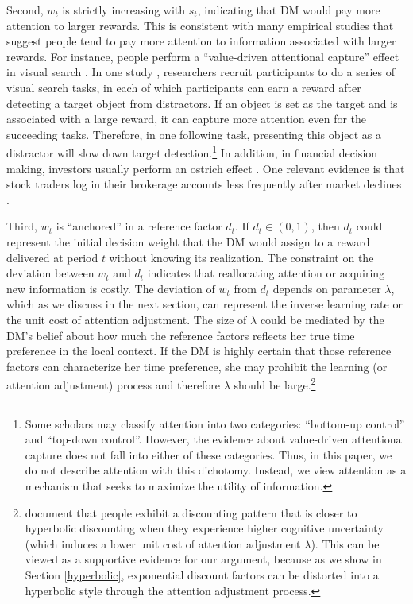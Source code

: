 \documentclass[
  12pt,
]{article}
\begin{document}
Second, \(w_t\) is strictly increasing with \(s_t\), indicating that DM
would pay more attention to larger rewards. This is consistent with many
empirical studies that suggest people tend to pay more attention to
information associated with larger rewards. For instance, people perform
a ``value-driven attentional capture'' effect in visual search
\citep{della2009learning, hickey2010reward, anderson2011value, chelazzi2013rewards, jahfari2017sensitivity}.
In one study \citep{anderson2011value}, researchers recruit participants
to do a series of visual search tasks, in each of which participants can
earn a reward after detecting a target object from distractors. If an
object is set as the target and is associated with a large reward, it
can capture more attention even for the succeeding tasks. Therefore, in
one following task, presenting this object as a distractor will slow
down target detection.\footnote{Some scholars may classify attention
  into two categories: ``bottom-up control'' and ``top-down control''.
  However, the evidence about value-driven attentional capture does not
  fall into either of these categories. Thus, in this paper, we do not
  describe attention with this dichotomy. Instead, we view attention as
  a mechanism that seeks to maximize the utility of information.} In
addition, in financial decision making, investors usually perform an
ostrich effect \citep{galai2006ostrich, karlsson2009ostrich}. One
relevant evidence is that stock traders log in their brokerage accounts
less frequently after market declines \citep{sicherman2016financial}.

Third, \(w_t\) is ``anchored'' in a reference factor \(d_t\). If
\(d_t\in(0,1)\), then \(d_t\) could represent the initial decision
weight that the DM would assign to a reward delivered at period \(t\)
without knowing its realization. The constraint on the deviation between
\(w_t\) and \(d_t\) indicates that reallocating attention or acquiring
new information is costly. The deviation of \(w_t\) from \(d_t\) depends
on parameter \(\lambda\), which as we discuss in the next section, can
represent the inverse learning rate or the unit cost of attention
adjustment. The size of \(\lambda\) could be mediated by the DM's belief
about how much the reference factors reflects her true time preference
in the local context. If the DM is highly certain that those reference
factors can characterize her time preference, she may prohibit the
learning (or attention adjustment) process and therefore \(\lambda\)
should be large.\footnote{\citet{enke2023complexity} document that
  people exhibit a discounting pattern that is closer to hyperbolic
  discounting when they experience higher cognitive uncertainty (which
  induces a lower unit cost of attention adjustment \(\lambda\)). This
  can be viewed as a supportive evidence for our argument, because as we
  show in Section \ref{hyperbolic}, exponential discount factors can be
  distorted into a hyperbolic style through the attention adjustment
  process.}
\end{document}
